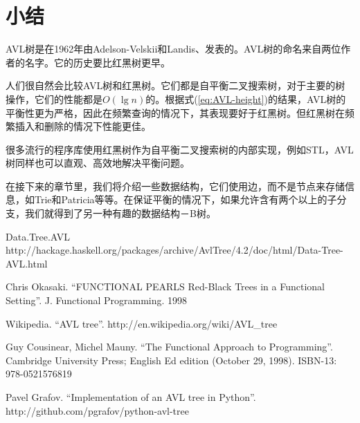 \documentclass[UTF8]{article}
\begin{document}
\section{小结}
AVL树是在1962年由Adelson-Velskii和Landis\cite{wiki}、\cite{TFATP}发表的。AVL树的命名来自两位作者的名字。它的历史要比红黑树更早。

人们很自然会比较AVL树和红黑树。它们都是自平衡二叉搜索树，对于主要的树操作，它们的性能都是$O(\lg n)$的。根据式(\ref{eq:AVL-height})的结果，AVL树的平衡性更为严格，因此在频繁查询的情况下，其表现要好于红黑树\cite{wiki}。但红黑树在频繁插入和删除的情况下性能更佳。

很多流行的程序库使用红黑树作为自平衡二叉搜索树的内部实现，例如STL，AVL树同样也可以直观、高效地解决平衡问题。

在接下来的章节里，我们将介绍一些数据结构，它们使用边，而不是节点来存储信息，如Trie和Patricia等等。在保证平衡的情况下，如果允许含有两个以上的子分支，我们就得到了另一种有趣的数据结构－B树。

\begin{thebibliography}{99}

Data.Tree.AVL http://hackage.haskell.org/packages/archive/AvlTree/4.2/doc/html/Data-Tree-AVL.html

Chris Okasaki. ``FUNCTIONAL PEARLS Red-Black Trees in a Functional Setting''. J. Functional Programming. 1998

Wikipedia. ``AVL tree''. http://en.wikipedia.org/wiki/AVL\_tree

Guy Cousinear, Michel Mauny. ``The Functional Approach to Programming''. Cambridge University Press; English Ed edition (October 29, 1998). ISBN-13: 978-0521576819

Pavel Grafov. ``Implementation of an AVL tree in Python''. http://github.com/pgrafov/python-avl-tree
\end{thebibliography}

\ifx\wholebook\relax\else
\end{document}
